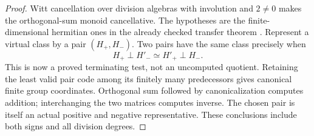 \begin{proof}
Witt cancellation over division
algebras with involution and
$2\ne0$ makes the orthogonal-sum
monoid cancellative.
The hypotheses are the
finite-dimensional hermitian
ones in the already checked
transfer theorem
\cite[Section 3, pp.\ 271--273]{C-QSS1979}.
Represent a virtual class by
a pair $(H_+,H_-)$.
Two pairs have the same class
precisely when
\[
                 H_+\perp H'_-\simeq H'_+\perp H_- .
                                                               \tag{C.3.GH8}
\]
This is now a proved terminating
test, not an uncomputed quotient.
Retaining the least valid pair
code among its finitely many
predecessors gives canonical
finite group coordinates.
Orthogonal sum followed by
canonicalization computes addition;
interchanging the two matrices
computes inverse.
The chosen pair is itself an
actual positive and negative
representative.
These conclusions include both
signs and all division degrees.
\end{proof}
